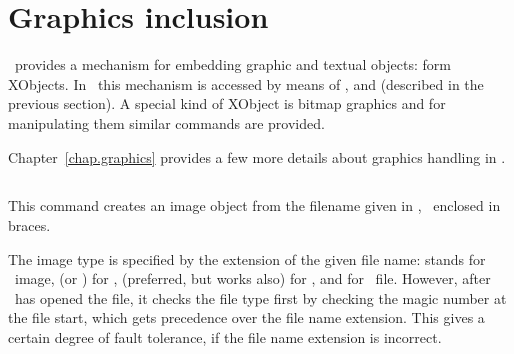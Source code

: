 \documentclass{pdftexmanual}
\begin{document}
\section{Graphics inclusion}

\PDF\ provides a mechanism for embedding graphic and textual objects:
form XObjects. In \PDFTEX\ this mechanism is accessed by means of
,  and  (described in the
previous section). A special kind of XObject is bitmap graphics and
for manipulating them similar commands are provided.

Chapter~\ref{chap.graphics} provides a few more details about graphics
handling in \PDFTEX.

\subsection{}

\noindent {}

\noindent{}

This command creates an image object from the filename given in
, \ie\ enclosed in braces.

The image type is specified by the extension of the given file name:
 stands for \PNG\ image,  (or ) for
\JPEG,  (preferred, but  works also) for
\JBIGTWO, and  for \PDF\ file. However, after \PDFTEX\ has
opened the file, it checks the file type first by checking the magic
number at the file start, which gets precedence over the file name
extension. This gives a certain degree of fault tolerance, if the file
name extension is incorrect.
\end{document}
